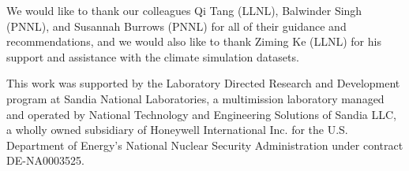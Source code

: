 We would like to thank our colleagues Qi Tang (LLNL), Balwinder Singh (PNNL), and Susannah Burrows (PNNL) for all of their guidance and recommendations, and we would also like to thank Ziming Ke (LLNL) for his support and assistance with the climate simulation datasets.

This work was supported by the Laboratory Directed Research and Development program at
Sandia National Laboratories, a multimission laboratory managed and operated by National
Technology and Engineering Solutions of Sandia LLC, a wholly owned subsidiary of Honeywell
International Inc. for the U.S. Department of Energy’s National Nuclear Security Administration
under contract DE-NA0003525.
